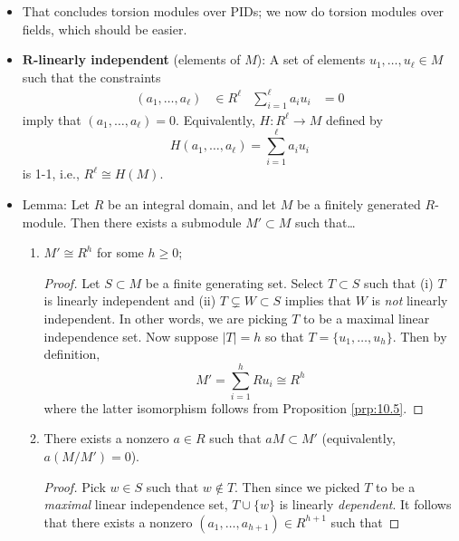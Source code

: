 \documentclass[../notes.tex]{subfiles}
\begin{document}
\begin{itemize}
\begin{proof}
        Consider the $\Ann(R^h)$. It is a principal ideal since $R$ is a PID.

        Can we take $R^h\cong R\oplus\cdots\oplus R=R/(0)\oplus\cdots\oplus R/(0)$, $h$ times?
    \end{proof}
    \item That concludes torsion modules over PIDs; we now do torsion modules over fields, which should be easier.
    \item \textbf{$\bm{R}$-linearly independent} (elements of $M$): A set of elements $u_1,\dots,u_\ell\in M$ such that the constraints
    \begin{align*}
        (a_1,\dots,a_\ell) &\in R^\ell&
        \sum_{i=1}^\ell a_iu_i &= 0
    \end{align*}
    imply that $(a_1,\dots,a_\ell)=0$. Equivalently, $H:R^\ell\to M$ defined by
    \begin{equation*}
        H(a_1,\dots,a_\ell) = \sum_{i=1}^\ell a_iu_i
    \end{equation*}
    is 1-1, i.e., $R^\ell\cong H(M)$.
    \item Lemma: Let $R$ be an integral domain, and let $M$ be a finitely generated $R$-module. Then there exists a submodule $M'\subset M$ such that\dots
    \begin{enumerate}[label={(\roman*)}]
        \item $M'\cong R^h$ for some $h\geq 0$;
        \begin{proof}
            Let $S\subset M$ be a finite generating set. Select $T\subset S$ such that (i) $T$ is linearly independent and (ii) $T\subsetneq W\subset S$ implies that $W$ is \emph{not} linearly independent. In other words, we are picking $T$ to be a maximal linear independence set. Now suppose $|T|=h$ so that $T=\{u_1,\dots,u_h\}$. Then by definition,
            \begin{equation*}
                M' = \sum_{i=1}^hRu_i
                \cong R^h
            \end{equation*}
            where the latter isomorphism follows from Proposition \ref{prp:10.5}.
        \end{proof}
        \item There exists a nonzero $a\in R$ such that $aM\subset M'$ (equivalently, $a(M/M')=0$).
        \begin{proof}
            Pick $w\in S$ such that $w\notin T$. Then since we picked $T$ to be a \emph{maximal} linear independence set, $T\cup\{w\}$ is linearly \emph{dependent}. It follows that there exists a nonzero $(a_1,\dots,a_{h+1})\in R^{h+1}$ such that

\end{proof}
\end{enumerate}
\end{itemize}
\end{document}
